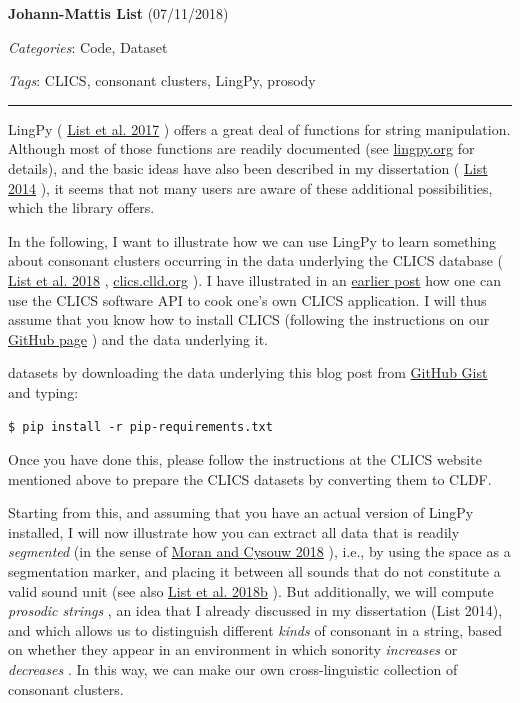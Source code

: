 \documentclass[
  english,
  a4paper,
  oneside,tablecaptionabove
]{scrbook}
\begin{document}
\textbf{Johann-Mattis List} (07/11/2018)

\emph{Categories}: Code, Dataset

\emph{Tags}: CLICS, consonant clusters, LingPy, prosody

\begin{center}\rule{0.5\linewidth}{\linethickness}\end{center}

LingPy ( \href{http://bibliography.lingpy.org?key=List2017i}{List et al.
2017} ) offers a great deal of functions for string manipulation.
Although most of those functions are readily documented (see
\href{http://lingpy.org}{lingpy.org} for details), and the basic ideas
have also been described in my dissertation (
\href{http://bibliography.lingpy.org?key=List2014d}{List 2014} ), it
seems that not many users are aware of these additional possibilities,
which the library offers.

In the following, I want to illustrate how we can use LingPy to learn
something about consonant clusters occurring in the data underlying the
CLICS database (
\href{http://bibliography.lingpy.org?key=List2018e}{List et al. 2018} ,
\href{https://clics.clld.org}{clics.clld.org} ). I have illustrated in
an \href{https://calc.hypotheses.org/date/2018/08}{earlier post} how one
can use the CLICS software API to cook one's own CLICS application. I
will thus assume that you know how to install CLICS (following the
instructions on our \href{https://github.com/clics/clics2}{GitHub page}
) and the data underlying it.

datasets by downloading the data underlying this blog post from
\href{https://gist.github.com/LinguList/1056960125ca79428b420257fa4b02eb}{GitHub
Gist} and typing:

\begin{lstlisting}
$ pip install -r pip-requirements.txt
\end{lstlisting}

Once you have done this, please follow the instructions at the CLICS
website mentioned above to prepare the CLICS datasets by converting them
to CLDF.

Starting from this, and assuming that you have an actual version of
LingPy installed, I will now illustrate how you can extract all data
that is readily \emph{segmented} (in the sense of
\href{http://bibliography.lingpy.org?key=Moran2018}{Moran and Cysouw
2018} ), i.e., by using the space as a segmentation marker, and placing
it between all sounds that do not constitute a valid sound unit (see
also \href{http://bibliography.lingpy.org?key=List2018d}{List et al.
2018b} ). But additionally, we will compute \emph{prosodic strings} , an
idea that I already discussed in my dissertation (List 2014), and which
allows us to distinguish different \emph{kinds} of consonant in a
string, based on whether they appear in an environment in which sonority
\emph{increases} or \emph{decreases} . In this way, we can make our own
cross-linguistic collection of consonant clusters.
\end{document}

